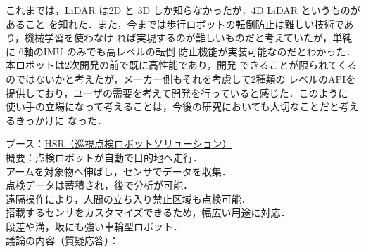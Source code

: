 \documentclass{jsarticle}
\begin{document}
\hspace*{5.7zw}これまでは，LiDAR は2D と 3D しか知らなかったが，4D LiDAR というものがあること
\hspace*{6.7zw}を知れた．また，今までは歩行ロボットの転倒防止は難しい技術であり，機械学習を使わなけ
\hspace*{6.7zw}れば実現するのが難しいものだと考えていたが，単純に 6軸のIMU のみでも高レベルの転倒
\hspace*{6.7zw}防止機能が実装可能なのだとわかった．本ロボットは2次開発の前で既に高性能であり，開発
\hspace*{6.7zw}できることが限られてくるのではないかと考えたが，メーカー側もそれを考慮して2種類の
\hspace*{6.7zw}レベルのAPIを提供しており，ユーザの需要を考えて開発を行っていると感じた．このように
\hspace*{6.7zw}使い手の立場になって考えることは，今後の研究においても大切なことだと考えるきっかけに
\hspace*{6.7zw}なった．\\


\vspace*{4mm}

\hspace*{4.7zw}ブース：\underline{HSR（巡視点検ロボットソリューション）}\\

\hspace*{4.7zw}概要：点検ロボットが自動で目的地へ走行．\\
\hspace*{8.7zw}アームを対象物へ伸ばし，センサでデータを収集．\\
\hspace*{8.7zw}点検データは蓄積され，後で分析が可能．\\
\hspace*{8.7zw}遠隔操作により，人間の立ち入り禁止区域も点検可能．\\
\hspace*{8.7zw}搭載するセンサをカスタマイズできるため，幅広い用途に対応．\\
\hspace*{8.7zw}段差や溝，坂にも強い車輪型ロボット．\\

\hspace*{4.7zw}議論の内容（質疑応答）：
\end{document}
